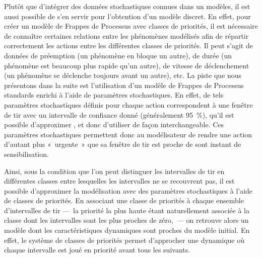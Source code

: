 \myskip

Plutôt que d'intégrer des données stochastiques connues dans un modèles,
il est aussi possible de s'en servir pour l'obtention d'un modèle discret.
En effet, pour créer un modèle de Frappes de Processus avec classes de priorités,
il est nécessaire de connaître certaines relations entre les phénomènes modélisés
afin de répartir correctement les actions entre les différentes classes de priorités.
Il peut s'agit de données de préemption (un phénomène en bloque un autre),
de durée (un phénomène est beaucoup plus rapide qu'un autre),
de vitesse de déclenchement (un phénomène se déclenche toujours avant un autre), etc.
La piste que nous présentons dans la suite est l'utilisation d'un modèle de Frappes de Processus
standards enrichi à l'aide de paramètres stochastiques.
En effet, de tels paramètres stochastiques définis pour chaque action correspondent
à une fenêtre de tir avec un intervalle de confiance donné (généralement 95~\%),
qu'il est possible d'approximer \cite[p.~72]{Pauleve11},
et donc d'utiliser de façon interchangeable.
Ces paramètres stochastiques permettent donc au modélisateur de rendre une action
d'autant plus «~urgente~» que sa fenêtre de tir est proche de sont instant
de sensibilisation.

Ainsi, sous la condition que l'on peut distinguer les intervalles de tir en différentes classes
entre lesquelles les intervalles ne se recouvrent pas,
il est possible d'approximer la modélisation avec des paramètres stochastiques à
l'aide de classes de priorités.
En associant une classe de priorités à chaque ensemble d'intervalles de tir
---~la priorité la plus haute étant naturellement associée à la classe dont les intervalles
sont les plus proches de zéro,~---
on retrouve alors un modèle dont les caractéristiques dynamiques sont proches
du modèle initial.
En effet, le système de classes de priorités permet d'approcher une dynamique où
chaque intervalle est joué en priorité avant tous les suivants.

